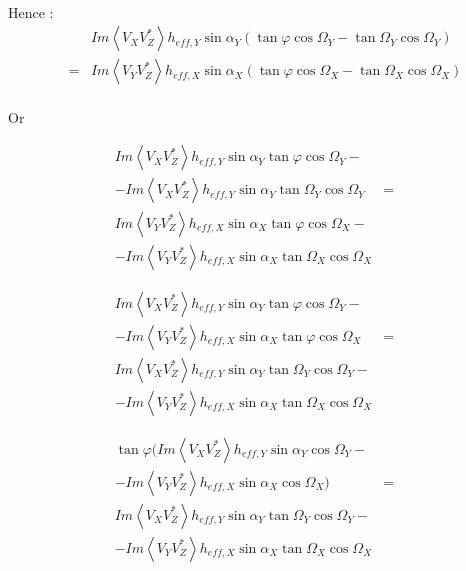 \documentclass[a4paper,10pt]{thesis}
\begin{document}
\paragraph*{}
Hence :
\begin{eqnarray}
& & Im \left\langle V_X V_Z^{*}\right\rangle h_{eff,Y} \sin \alpha_Y ( \tan \varphi \cos \Omega_Y-\tan \Omega_Y \cos \Omega_Y) \\
&=& Im \left\langle V_Y V_Z^{*}\right\rangle h_{eff,X} \sin \alpha_X (\tan \varphi \cos \Omega_X-\tan \Omega_X \cos \Omega_X) \nonumber
\end{eqnarray}
\paragraph*{}
Or

\begin{eqnarray}
 Im \left\langle V_X V_Z^{*}\right\rangle h_{eff,Y} \sin \alpha_Y \tan \varphi \cos \Omega_Y - & &\\
 -Im \left\langle V_X V_Z^{*}\right\rangle h_{eff,Y} \sin \alpha_Y \tan \Omega_Y \cos \Omega_Y &=&\nonumber\\
 Im \left\langle V_Y V_Z^{*}\right\rangle h_{eff,X} \sin \alpha_X \tan \varphi \cos \Omega_X - & &\nonumber \\
 -Im \left\langle V_Y V_Z^{*}\right\rangle h_{eff,X} \sin \alpha_X \tan \Omega_X \cos \Omega_X & &\nonumber
\end{eqnarray}

\begin{eqnarray}
 Im \left\langle V_X V_Z^{*}\right\rangle h_{eff,Y} \sin \alpha_Y \tan \varphi \cos \Omega_Y-& &\\
 -Im \left\langle V_Y V_Z^{*}\right\rangle h_{eff,X} \sin \alpha_X \tan \varphi \cos \Omega_X &=&\nonumber \\
 Im \left\langle V_X V_Z^{*}\right\rangle h_{eff,Y} \sin \alpha_Y \tan \Omega_Y \cos \Omega_Y - & &\nonumber\\
 -Im \left\langle V_Y V_Z^{*}\right\rangle h_{eff,X} \sin \alpha_X \tan \Omega_X \cos \Omega_X & &\nonumber
\end{eqnarray}

\begin{eqnarray}
\tan \varphi  (Im \left\langle V_X V_Z^{*}\right\rangle h_{eff,Y} \sin \alpha_Y \cos \Omega_Y-& &\\
 -Im \left\langle V_Y V_Z^{*}\right\rangle h_{eff,X} \sin \alpha_X  \cos \Omega_X) &=&\nonumber \\
 Im \left\langle V_X V_Z^{*}\right\rangle h_{eff,Y} \sin \alpha_Y \tan \Omega_Y \cos \Omega_Y -& &\nonumber\\
 -Im \left\langle V_Y V_Z^{*}\right\rangle h_{eff,X} \sin \alpha_X \tan \Omega_X \cos \Omega_X & &\nonumber
\end{eqnarray}
\end{document}
